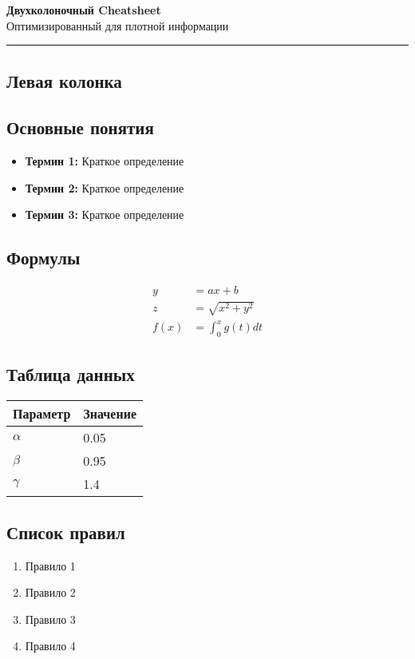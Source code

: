 \documentclass[10pt,landscape,a4paper]{article}
\begin{document}
\begin{center}
    {\Huge\bfseries Двухколоночный Cheatsheet}\\[0.5cm]
    {\large Оптимизированный для плотной информации}\\[0.3cm]
    \rule{\textwidth}{1pt}
\end{center}

\begin{multicols}{2}

\section{Левая колонка}

\subsection{Основные понятия}
\begin{itemize}
    \item \textbf{Термин 1:} Краткое определение
    \item \textbf{Термин 2:} Краткое определение
    \item \textbf{Термин 3:} Краткое определение
\end{itemize}

\subsection{Формулы}
\begin{align}
    y &= ax + b \\
    z &= \sqrt{x^2 + y^2} \\
    f(x) &= \int_0^x g(t) dt
\end{align}

\subsection{Таблица данных}
\begin{center}
\small
\begin{tabular}{@{}ll@{}}
\toprule
Параметр & Значение \\
\midrule
$\alpha$ & 0.05 \\
$\beta$ & 0.95 \\
$\gamma$ & 1.4 \\
\bottomrule
\end{tabular}
\end{center}

\subsection{Список правил}
\begin{enumerate}
    \item Правило 1
    \item Правило 2
    \item Правило 3
    \item Правило 4
\end{enumerate}


\end{multicols}
\end{document}
